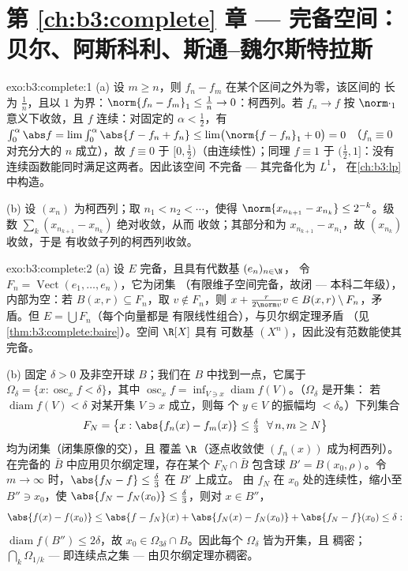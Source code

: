 \section*{第 \ref{ch:b3:complete} 章 --- 完备空间：
贝尔、阿斯科利、斯通--魏尔斯特拉斯}

\begin{solution}{exo:b3:complete:1}
(a) 设 $m \geq n$，则 $f_n - f_m$ 在某个区间之外为零，该区间的
长为 $\frac1n$，且以 $1$ 为界：$\norm{f_n - f_m}_1
\leq \frac1n \to 0$：柯西列。若 $f_n \to f$ 按
$\norm\cdot_1$ 意义下收敛，且 $f$ 连续：对固定的 $\alpha <
\frac12$，有 $\int_0^{\alpha}\abs f = \lim \int_0^\alpha\abs{f -
f_n + f_n} \leq \lim\bigl(\norm{f - f_n}_1 + 0\bigr) = 0$
（$f_n \equiv 0$ 对充分大的 $n$ 成立），故 $f \equiv 0$ 于
$[0, \frac12)$（由连续性）；同理 $f \equiv 1$ 于
$(\frac12, 1]$：没有连续函数能同时满足这两者。因此该空间
不完备 --- 其完备化为 $L^1$，
在\cref{ch:b3:lp}中构造。

(b) 设 $(x_n)$ 为柯西列；取 $n_1 < n_2 < \cdots$，使得
$\norm{x_{n_{k+1}} - x_{n_k}} \leq 2^{-k}$。级数
$\sum_k (x_{n_{k+1}} - x_{n_k})$ 绝对收敛，从而
收敛；其部分和为 $x_{n_{k+1}} - x_{n_1}$，故
$(x_{n_k})$ 收敛，于是
有收敛子列的柯西列收敛。
\end{solution}

\begin{solution}{exo:b3:complete:2}
(a) 设 $E$ 完备，且具有代数基 $(e_n)_{n\in\N}$，
令 $F_n = \operatorname{Vect}(e_1, \dots, e_n)$，它为闭集
（有限维子空间完备，故闭 ---
本科二年级），内部为空：若 $B(x, r) \subseteq F_n$，取
$v \notin F_n$，则 $x + \frac{r}{2\norm v}v \in B(x,r)
\setminus F_n$，矛盾。但 $E = \bigcup F_n$（每个向量都是
有限线性组合），与贝尔纲定理矛盾
（见\cref{thm:b3:complete:baire}）。空间 $\R[X]$ 具有
可数基 $(X^n)$，因此没有范数能使其完备。

(b) 固定 $\delta > 0$ 及非空开球 $B$；我们在
$B$ 中找到一点，它属于 $\Omega_\delta = \{x : \operatorname{osc}_xf <
\delta\}$，其中 $\operatorname{osc}_xf = \inf_{V \ni
x}\operatorname{diam} f(V)$。（$\Omega_\delta$ 是开集：
若 $\operatorname{diam}f(V) < \delta$ 对某开集 $V \ni x$ 成立，则每
个 $y \in V$ 的振幅均 $< \delta$。）下列集合
\[
F_N = \bigl\{x : \abs{f_n(x) - f_m(x)} \leq \tfrac\delta3\
\ \forall\, n, m \geq N \bigr\}
\]
均为闭集（闭集原像的交），且
覆盖 $\R$（逐点收敛使 $(f_n(x))$ 成为柯西列）。
在完备的 $\bar B$ 中应用贝尔纲定理，存在某个 $F_N \cap
\bar B$ 包含球 $B' = B(x_0, \rho)$。令 $m \to
\infty$ 时，$\abs{f_N - f} \leq \frac\delta3$ 在 $B'$ 上成立。
由 $f_N$ 在 $x_0$ 处的连续性，缩小至 $B'' \ni x_0$，使
$\abs{f_N - f_N(x_0)} \leq \frac\delta3$，则对 $x \in B''$，
\[
\abs{f(x) - f(x_0)} \leq \abs{f - f_N}(x) + \abs{f_N(x) -
f_N(x_0)} + \abs{f_N - f}(x_0) \leq \delta:
\]
$\operatorname{diam} f(B'') \leq 2\delta$，故 $x_0 \in
\Omega_{3\delta} \cap B$。因此每个 $\Omega_\delta$ 皆为开集，且
稠密；$\bigcap_k\Omega_{1/k}$ ---
即连续点之集 --- 由贝尔纲定理亦稠密。
\end{solution}

